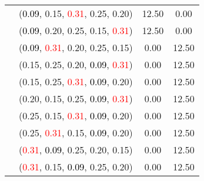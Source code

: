 \documentclass[10pt,a4paper]{report}
\begin{document}
\begin{center}
\begin{longtable}{clcc}
			&(\textcolor{black}{0.09}, 0.15, \textcolor{red}{0.31}, 0.25, 0.20)&12.50&0.00\\
			&(\textcolor{black}{0.09}, 0.20, 0.25, 0.15, \textcolor{red}{0.31})&12.50&0.00\\
			&(\textcolor{black}{0.09}, \textcolor{red}{0.31}, 0.20, 0.25, 0.15)&0.00&12.50\\
			&(0.15, 0.25, 0.20, \textcolor{black}{0.09}, \textcolor{red}{0.31})&0.00&12.50\\
			&(0.15, 0.25, \textcolor{red}{0.31}, \textcolor{black}{0.09}, 0.20)&0.00&12.50\\
			&(0.20, 0.15, 0.25, \textcolor{black}{0.09}, \textcolor{red}{0.31})&0.00&12.50\\
			&(0.25, 0.15, \textcolor{red}{0.31}, \textcolor{black}{0.09}, 0.20)&0.00&12.50\\
			&(0.25, \textcolor{red}{0.31}, 0.15, \textcolor{black}{0.09}, 0.20)&0.00&12.50\\
			&(\textcolor{red}{0.31}, \textcolor{black}{0.09}, 0.25, 0.20, 0.15)&0.00&12.50\\
			&(\textcolor{red}{0.31}, 0.15, \textcolor{black}{0.09}, 0.25, 0.20)&0.00&12.50\\
		\bottomrule
	\end{longtable}
\end{center}
\end{document}
